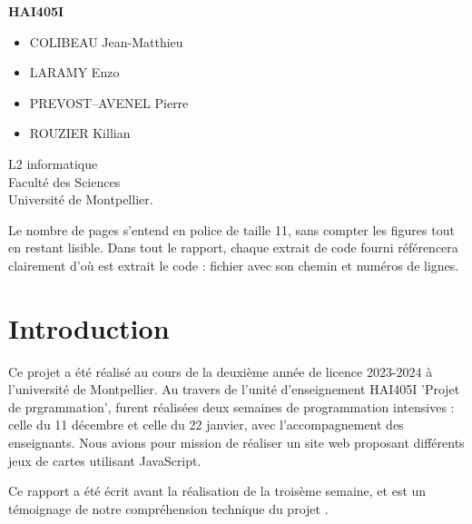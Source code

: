 \documentclass[a4paper]{article}
\begin{document}
\centerline{\Huge\bf HAI405I}
\vspace*{1.5cm}
\begin{center}               %
	

\end{center}
\vspace*{1.5cm}


\vspace*{1.5cm}


\begin{itemize}
\item COLIBEAU Jean-Matthieu
\item LARAMY Enzo
\item PREVOST--AVENEL Pierre
\item ROUZIER Killian
\end{itemize}
\vspace*{1.5cm}
\begin{center}
  L2 informatique\\
  Faculté des Sciences\\
Université de Montpellier.
\end{center}

\newpage
Le nombre de pages s'entend en police de taille 11, sans compter les figures tout en restant lisible.  Dans tout le rapport, chaque extrait de code fourni référencera clairement d’où est extrait le code : fichier avec son chemin et numéros de lignes. 

\section{Introduction}
Ce projet a été réalisé au cours de la deuxième année de licence 2023-2024 à l'université de Montpellier. Au travers de l'unité d'enseignement HAI405I 'Projet de prgrammation', furent réalisées deux semaines de programmation intensives : celle du  11  décembre et celle du 22 janvier, avec l'accompagnement des enseignants. Nous avions pour mission de réaliser un site web proposant différents jeux de cartes utilisant JavaScript. 


Ce rapport a été écrit avant la réalisation de la troisème semaine, et est un témoignage de notre compréhension technique du projet .
\end{document}
